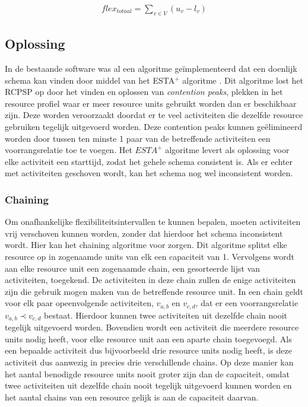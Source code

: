 \begin{align}
\label{eq:flex1}
    flex_{totaal} = \sum_{v \in V} (u_v - l_v)
\end{align}

\subsection{Oplossing}
\label{subsec:probleemoplossing}
In de bestaande software was al een algoritme ge\"implementeerd dat een doenlijk schema kan vinden door middel van het ESTA$^+$ algoritme \cite{ronaldevers2010}.
Dit algoritme lost het RCPSP op door het vinden en oplossen van \emph{contention peaks}, plekken in het resource profiel waar er meer resource units gebruikt worden dan er beschikbaar zijn. Deze worden veroorzaakt doordat er te veel activiteiten die dezelfde resource gebruiken tegelijk uitgevoerd worden. Deze contention peaks kunnen ge\"elimineerd worden door tussen ten minste 1 paar van de betreffende activiteiten een voorrangsrelatie toe te voegen. Het $ESTA^+$ algoritme levert als oplossing voor elke activiteit een starttijd, zodat het gehele schema consistent is. Als er echter met activiteiten geschoven wordt, kan het schema nog wel inconsistent worden.

\subsubsection{Chaining}
\label{subsubsec:chainingoplossing}
Om onafhankelijke flexibiliteitsintervallen te kunnen bepalen, moeten activiteiten vrij verschoven kunnen worden, zonder dat hierdoor het schema inconsistent wordt. Hier kan het chaining algoritme voor zorgen. Dit algoritme splitst elke resource op in zogenaamde units van elk een capaciteit van 1. Vervolgens wordt aan elke resource unit een zogenaamde chain, een gesorteerde lijst van activiteiten, toegekend. De activiteiten in deze chain zullen de enige activiteiten zijn die gebruik mogen maken van de betreffende resource unit. In een chain geldt voor elk paar opeenvolgende activiteiten, $v_{a,b}$ en $v_{c,d}$, dat er een voorrangsrelatie $v_{a,b} \prec v_{c,d}$ bestaat. Hierdoor kunnen twee activiteiten uit dezelfde chain nooit tegelijk uitgevoerd worden. Bovendien wordt een activiteit die meerdere resource units nodig heeft, voor elke resource unit aan een aparte chain toegevoegd. Als een bepaalde activiteit dus bijvoorbeeld drie resource units nodig heeft, is deze activiteit dus aanwezig in precies drie verschillende chains. Op deze manier kan het aantal benodigde resource units nooit groter zijn dan de capaciteit, omdat twee activiteiten uit dezelfde chain nooit tegelijk uitgevoerd kunnen worden en het aantal chains van een resource gelijk is aan de capaciteit daarvan.

